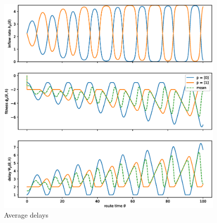 \documentclass[10pt]{beamer}
\begin{document}
\begin{frame}

	\begin{center}
		\begin{figure}
			\includegraphics[scale=0.3]{img/pres-replicator_avg_tt.eps}
			\caption{Average delays}	
		\end{figure}	  
	\end{center}  
  
\end{frame}
\end{document}
